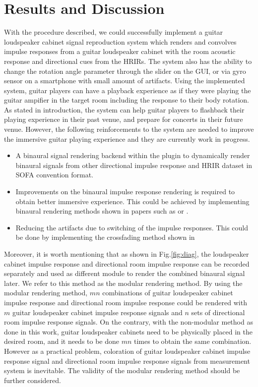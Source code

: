 \documentclass[convention,e-brief]{aesconf-current}
\begin{document}
\section{Results and Discussion}
With the procedure described, we could successfully implement a guitar loudspeaker cabinet signal reproduction system which renders and convolves impulse responses from a guitar loudspeaker cabinet with the room acoustic response and directional cues from the HRIRs.
The system also has the ability to change the rotation angle parameter through the slider on the GUI, or via gyro sensor on a smartphone with small amount of artifacts.
Using the implemented system, guitar players can have a playback experience as if they were playing the guitar ampifier in the target room including the response to their body rotation.
As stated in introduction, the system can help guitar players to flashback their playing experience in their past venue, and prepare for concerts in their future venue.
However, the following reinforcements to the system are needed to improve the immersive guitar playing experience and they are currently work in progress.

\begin{itemize}
    \item A binaural signal rendering backend within the plugin to dynamically render binaural signals from other directional impulse response and HRIR dataset in SOFA convention format.
    \item Improvements on the binaural impulse response rendering is required to obtain better immersive experience.
          This could be achieved by implementing binaural rendering methods shown in papers such as \cite{Zaunschirm2018-mn} or \cite{Schorkhuber2018-ql}.
    \item Reducing the artifacts due to switching of the impulse responses. This could be done by implementing the crossfading method shown in \cite{phdthesis}
\end{itemize}

Moreover, it is worth mentioning that as shown in Fig.\ref{fig:diag}, the loudspeaker cabinet impulse response and directional room impulse response can be recorded separately and used as different module to render the combined binaural signal later.
We refer to this method as the modular rendering method.
By using the modular rendering method, $mn$ combinations of guitar loudspeaker cabinet impulse response and directional room impulse response could be rendered with $m$ guitar loudspeaker cabinet impulse response signals and $n$ sets of directional room impulse response signals.
On the contrary, with the non-modular method as done in this work, guitar loudspeaker cabinets need to be physically placed in the desired room, and it needs to be done $mn$ times to obtain the same combination.
However as a practical problem, coloration of guitar loudspeaker cabinet impulse response signal and directional room impulse response signals from measurement system is inevitable.
The validity of the modular rendering method should be further considered.
\end{document}
